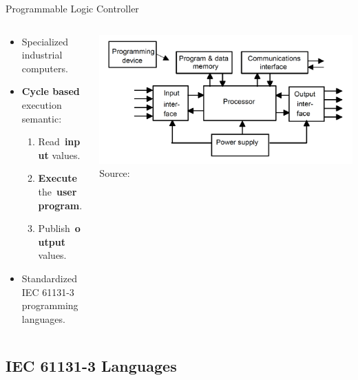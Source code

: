 \documentclass[18pt]{beamer}
\begin{document}
\begin{frame}{Programmable Logic Controller}
\begin{columns}
    \begin{column}{0.5\textwidth}
        \begin{itemize}
            \item Specialized industrial computers.
            \item \textbf{Cycle based} execution semantic:
            \begin{enumerate}
                \item Read~\textbf{input} values.
                \item \textbf{Execute} the~\textbf{user program}.
                \item Publish~\textbf{output} values.
            \end{enumerate}
            \item Standardized IEC 61131-3 programming languages.
        \end{itemize}
    \end{column}
    \begin{column}{0.5\textwidth}
        \includegraphics[width=\textwidth]{figures/PLC_Architecture.png}
        {\footnotesize Source:~\cite{BOLTON200653}}
    \end{column}
\end{columns}
\end{frame}

\subsection{IEC 61131-3 Languages}
\end{document}
